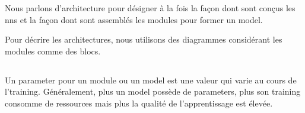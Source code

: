 Nous parlons d'\gls{architecture} pour désigner à la fois la façon dont sont conçus les \glspl{nn} et la façon dont sont assemblés les \glspl{module} pour former un \gls{model}.

Pour décrire les \glspl{architecture}, nous utilisons des diagrammes considérant les \glspl{module} comme des blocs.

\subsection{}
\label{def:parameter}
Un \gls{parameter} pour un \gls{module} ou un \gls{model} est une valeur qui varie au cours de l'\gls{training}. Généralement, plus un \gls{model} possède de \glspl{parameter}, plus son \gls{training} consomme de ressources mais plus la qualité de l'apprentissage est élevée.

%


